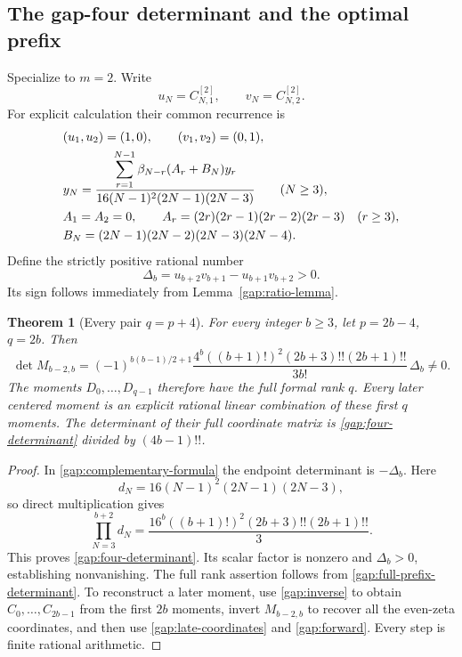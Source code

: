 \documentclass[11pt,letterpaper]{article}
\numberwithin{equation}{section}
\theoremstyle{plain}
\newtheorem{theorem}{Theorem}[section]
\theoremstyle{definition}
\theoremstyle{remark}
\begin{document}
\subsection{The gap-four determinant and the optimal prefix}

Specialize to $m=2$. Write
\[
 u_N=C_{N,1}^{[2]},\qquad v_N=C_{N,2}^{[2]}.
\]
For explicit calculation their common recurrence is
\begin{align}
 &(u_1,u_2)=(1,0),\qquad(v_1,v_2)=(0,1),\notag\\
 &y_N=\frac{\displaystyle\sum_{r=1}^{N-1}
                   \beta_{N-r}(A_r+B_N)y_r}
                {16(N-1)^2(2N-1)(2N-3)}\qquad(N\ge3),
 \label{gap:four-recurrence}\\
 &A_1=A_2=0,\qquad
 A_r=(2r)(2r-1)(2r-2)(2r-3)\quad(r\ge3),\notag\\
 &B_N=(2N-1)(2N-2)(2N-3)(2N-4).\notag
\end{align}
Define the strictly positive rational number
\begin{equation}\label{gap:delta}
 \Delta_b=u_{b+2}v_{b+1}-u_{b+1}v_{b+2}>0.
\end{equation}
Its sign follows immediately from Lemma~\ref{gap:ratio-lemma}.

\begin{theorem}[Every pair $q=p+4$]\label{gap:main}
For every integer $b\ge3$, let $p=2b-4$, $q=2b$. Then
\begin{equation}\label{gap:four-determinant}
 \det M_{b-2,b}
 =(-1)^{b(b-1)/2+1}
 \frac{4^b((b+1)!)^2(2b+3)!!(2b+1)!!}{3b!}\,\Delta_b\ne0.
\end{equation}
The moments $D_0,\ldots,D_{q-1}$ therefore have the full formal
rank $q$. Every later centered moment is an explicit rational
linear combination of these first $q$ moments. The determinant
of their full coordinate matrix is
\eqref{gap:four-determinant} divided by $(4b-1)!!$.
\end{theorem}

\begin{proof}
In \eqref{gap:complementary-formula} the endpoint determinant is
$-\Delta_b$. Here
\[
 d_N=16(N-1)^2(2N-1)(2N-3),
\]
so direct multiplication gives
\[
 \prod_{N=3}^{b+2}d_N
 =\frac{16^b((b+1)!)^2(2b+3)!!(2b+1)!!}{3}.
\]
This proves \eqref{gap:four-determinant}. Its scalar factor is
nonzero and $\Delta_b>0$, establishing nonvanishing. The full
rank assertion follows from \eqref{gap:full-prefix-determinant}.
To reconstruct a later moment, use \eqref{gap:inverse} to obtain
$C_0,\ldots,C_{2b-1}$ from the first $2b$ moments, invert
$M_{b-2,b}$ to recover all the even-zeta coordinates, and then use
\eqref{gap:late-coordinates} and \eqref{gap:forward}. Every step is
finite rational arithmetic.
\end{proof}
\end{document}
